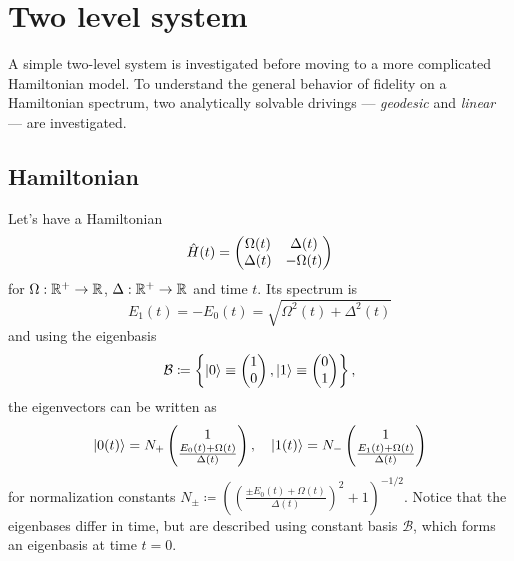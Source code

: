 \chapter{Two level system}
\label{chap:twoLevelSystem}
A simple two-level system is investigated before moving to a more complicated Hamiltonian model. To understand the general behavior of fidelity on a Hamiltonian spectrum, two analytically solvable drivings — \emph{geodesic} and \emph{linear} — are investigated.

\section{Hamiltonian}
Let's have a Hamiltonian
\begin{equation}
    \hat{H}(t)=\begin{pmatrix}
        \Omega(t)&\Delta(t)\\
        \Delta(t)&-\Omega(t)
    \end{pmatrix}
\end{equation}
for $\Omega: \mathbb{R}^+\rightarrow \mathbb{R}$, $\Delta: \mathbb{R}^+\rightarrow \mathbb{R}$ and time $t$. Its spectrum is
\begin{equation}
    E_1(t)=-E_0(t)= \sqrt{\Omega^2(t)+\Delta^2(t)}
    \label{eq:energy}
\end{equation}
and using the eigenbasis
\begin{equation}
    \mathcal{B}\coloneqq \left\{
        \ket{0}\equiv\begin{pmatrix}
                1\\0
            \end{pmatrix},
        \ket{1}\equiv\begin{pmatrix}
            0\\1
        \end{pmatrix} \right\},
    \label{eq:eigenbasisDef}
\end{equation}
the eigenvectors  can be written as 
\begin{equation}
\ket{0(t)}=N_+ \begin{pmatrix}
    1\\ \frac{E_0(t)+\Omega(t)}{\Delta(t)}
\end{pmatrix},\quad \ket{1(t)}=N_-\begin{pmatrix}
    1\\ \frac{E_1(t)+\Omega(t)}{\Delta(t)}
   \end{pmatrix}
   \label{eq:eigenvectors}
\end{equation}
for normalization constants $N_\pm\coloneqq\left(\left(\frac{\pm E_0(t)+\Omega(t)}{\Delta(t)}\right)^2+1\right)^{-1/2}$. Notice that the eigenbases differ in time, but are described using constant basis $\mathcal B$, which forms an eigenbasis at time $t=0$.

